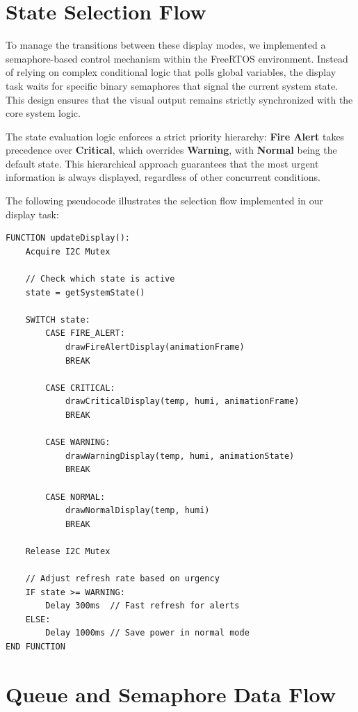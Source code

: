 \section{State Selection Flow}

To manage the transitions between these display modes, we implemented a semaphore-based control mechanism within the FreeRTOS environment. Instead of relying on complex conditional logic that polls global variables, the display task waits for specific binary semaphores that signal the current system state. This design ensures that the visual output remains strictly synchronized with the core system logic.

The state evaluation logic enforces a strict priority hierarchy: \textbf{Fire Alert} takes precedence over \textbf{Critical}, which overrides \textbf{Warning}, with \textbf{Normal} being the default state. This hierarchical approach guarantees that the most urgent information is always displayed, regardless of other concurrent conditions.

The following pseudocode illustrates the selection flow implemented in our display task:

\begin{verbatim}
FUNCTION updateDisplay():
    Acquire I2C Mutex
    
    // Check which state is active
    state = getSystemState()
    
    SWITCH state:
        CASE FIRE_ALERT:
            drawFireAlertDisplay(animationFrame)
            BREAK
            
        CASE CRITICAL:
            drawCriticalDisplay(temp, humi, animationFrame)
            BREAK
            
        CASE WARNING:
            drawWarningDisplay(temp, humi, animationState)
            BREAK
            
        CASE NORMAL:
            drawNormalDisplay(temp, humi)
            BREAK
            
    Release I2C Mutex
    
    // Adjust refresh rate based on urgency
    IF state >= WARNING:
        Delay 300ms  // Fast refresh for alerts
    ELSE:
        Delay 1000ms // Save power in normal mode
END FUNCTION
\end{verbatim}

\section{Queue and Semaphore Data Flow}

